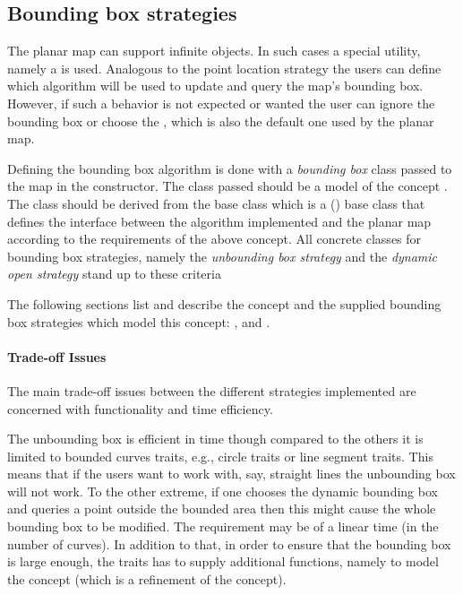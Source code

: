 \begin{ccAdvanced}
\subsection*{Bounding box strategies}
The planar map can support infinite objects. In such cases a special utility, namely a  is used. 
Analogous to the point location strategy the users can define which algorithm 
will be used to update and query the map's bounding box. However, if such a
behavior is not expected or wanted the user can ignore the bounding box
or choose the , which is also the default one used by the planar map.

Defining the bounding box algorithm is done with a {\em bounding box} class
passed to the map in the constructor. The class passed should be a model of the
concept . The  class should be
derived from the base class  which is a
() base class that defines the interface between the algorithm
implemented and the planar map according to the requirements of the above concept.
All concrete classes for bounding box strategies, namely the
{\em unbounding box strategy} and the {\em dynamic open strategy} 
stand up to these criteria 

The following sections list and describe the 
concept and the supplied bounding box strategies which model this concept:
, 
and
.

\paragraph{Trade-off Issues}
The main trade-off issues between the different strategies
implemented are concerned with functionality and time efficiency. 

The unbounding box is efficient in time though compared to 
the others it is limited to bounded curves traits, e.g., circle traits or
line segment traits.
This means that if the users want to work with, say, straight lines the unbounding
box will not work.
To the other extreme, if one chooses the dynamic bounding box and queries a 
point 
outside the bounded area then this might cause the whole bounding box to be 
modified. The requirement may be of a linear time (in the number of curves).
In addition to that, in order to ensure that the bounding box is
large enough, the traits has to supply 
additional functions, namely to model the  concept
(which is a refinement of the  concept).


\end{ccAdvanced}
